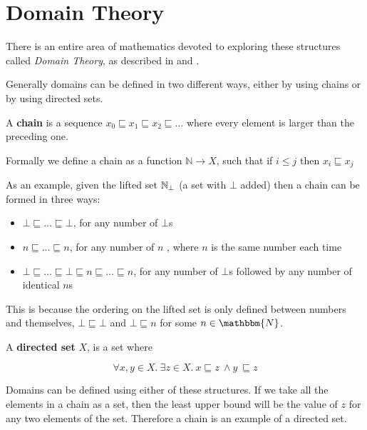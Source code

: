 \section{Domain Theory}\label{dom}
There is an entire area of mathematics devoted to exploring these structures called \emph{Domain Theory}, as described in \citep{Gunter92} and  \citep{Hutton14}.

Generally domains can be defined in two different ways, either by using chains or by using directed sets.

\vspace{0.5cm}

\begin{defn}
A \textbf{chain} is a sequence $x_0 \sqsubseteq x_1 \sqsubseteq x_2 \sqsubseteq \dots $ where every element is larger than the preceding one.

\vspace{0.5cm}

Formally we define a chain as a function $\mathbb{N} \to X$, such that if $i \leq j$ then $x_i \sqsubseteq x_j$
\end{defn}

As an example, given the lifted set  $\mathbb{N}_{\bot}$ (a set with $\bot$ added) then a chain can be formed in three ways:

\begin{itemize}
\item{$\bot \sqsubseteq \dots \sqsubseteq \bot$, for any number of $\bot$s}
\item{$n \sqsubseteq \dots \sqsubseteq n$, for any number of $n$ , where $n$ is the same number each time}
\item{$\bot \sqsubseteq \dots \sqsubseteq \bot \sqsubseteq n \sqsubseteq \dots \sqsubseteq n$, for any number of $\bot$s followed by any number of identical $n$s}
\end{itemize}

This is because the ordering on the lifted set is only defined between numbers and themselves, $\bot \sqsubseteq \bot$ and $\bot \sqsubseteq n$ for some $n \in \mathbbm{N}$.

\vspace{0.5cm}
 
\begin{defn}
A \textbf{directed set} $X$, is a set where

\[ \forall x,y \in X. \ \exists z \in X. \ x \sqsubseteq z \ \wedge y \ \sqsubseteq z \]
\end{defn}

Domains can be defined using either of these structures.  If we take all the elements in a chain as a set, then the least upper bound will be the value of $z$ for any two elements of the set. Therefore a chain is an example of a directed set.


